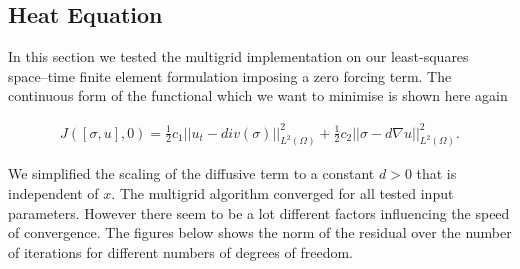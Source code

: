 \documentclass[../draft_1.tex]{subfiles}
\begin{document}
\FloatBarrier
\subsection{Heat Equation}

In this section we tested the multigrid implementation on our least-squares space--time finite element formulation imposing a zero forcing term. The continuous form of the functional which we want to minimise is shown here again

\begin{ceqn}
	\begin{equation}
	\begin{aligned}
	\label{J_heat_equation}
	J([\sigma, u], 0) = \frac{1}{2} c_1 || u_t - div(\sigma) ||_{L^2(\Omega)}^2 + \frac{1}{2} c_2 || \sigma - d \nabla u ||_{L^2(\Omega)}^2.
	\end{aligned}
	\end{equation}
\end{ceqn}

We simplified the scaling of the diffusive term to a constant $d > 0$ that is independent of $x$. The multigrid algorithm converged for all tested input parameters. However there seem to be a lot different factors influencing the speed of convergence. The figures below shows the norm of the residual over the number of iterations for different numbers of degrees of freedom. 
\end{document}
